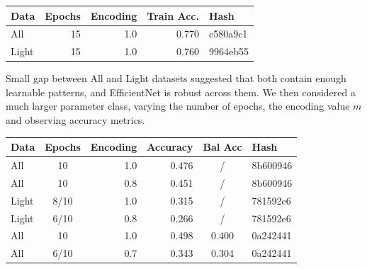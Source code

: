 \documentclass[10pt]{article}
\begin{document}
\begin{table}[h!]
  \centering
  \begin{tabular}{|l|r|r|r|l|}
    \hline
    Data  & Epochs & Encoding & Train Acc. & Hash     \\
    \hline
    All    & 15     & 1.0      & 0.770     & c580a9c1 \\
    Light  & 15     & 1.0      & 0.760     & 9964eb55 \\
    \hline
  \end{tabular}
  \label{tab:train_results}
\end{table}

Small gap between All and Light datasets suggested that both contain enough learnable patterns, and EfficientNet is robust across them. We then considered a much larger parameter class, varying the number of epochs, the encoding value $m$ and observing accuracy metrics.

\begin{table}[h!]
  \centering
  \begin{tabular}{|l|c|r|r|c|l|}
    \hline
    Data  & Epochs & Encoding & Accuracy & Bal Acc & Hash     \\
    \hline
    All   & 10     & 1.0      & 0.476    & /       & 8b600946 \\
    All   & 10     & 0.8      & 0.451    & /       & 8b600946 \\
    Light & 8/10   & 1.0      & 0.315    & /       & 781592e6 \\
    Light & 6/10   & 0.8      & 0.266    & /       & 781592e6 \\
    All   & 10     & 1.0      & 0.498    & 0.400   & 0a242441 \\
    All   & 6/10   & 0.7      & 0.343    & 0.304   & 0a242441 \\
    \hline
  \end{tabular}
  \label{tab:balanced_accuracy}
\end{table}
\end{document}
